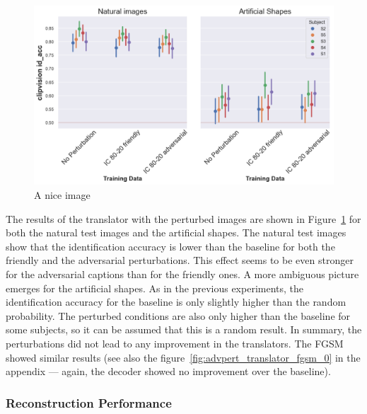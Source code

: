 \begin{figure}[ht]
    \centering
    \includegraphics[width=1\textwidth]{plots/advpert_translator_ic_80-20.png}
    \caption{A nice image}\label{fig:advpert_translator_ic_80}
\end{figure}

The results of the translator with the perturbed images are shown in Figure~\ref{fig:advpert_translator_ic_80} for both the natural test images and the artificial shapes. The natural test images show that the identification accuracy is lower than the baseline for both the friendly and the adversarial perturbations. This effect seems to be even stronger for the adversarial captions than for the friendly ones. A more ambiguous picture emerges for the artificial shapes. As in the previous experiments, the identification accuracy for the baseline is only slightly higher than the random probability. The perturbed conditions are also only higher than the baseline for some subjects, so it can be assumed that this is a random result. In summary, the perturbations did not lead to any improvement in the translators. The FGSM showed similar results (see also the figure~\ref{fig:advpert_translator_fgsm_0} in the appendix --- again, the decoder showed no improvement over the baseline). 



\subsubsection{Reconstruction Performance}

